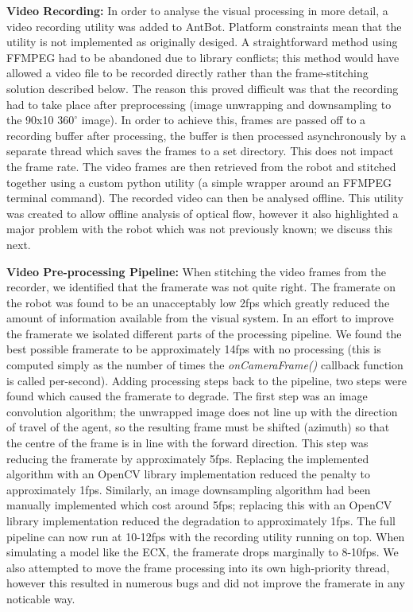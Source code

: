 \documentclass[a4paper,11pt,twoside,openright]{article}
\begin{document}
\textbf{Video Recording:} In order to analyse the visual processing in
more detail, a video recording utility was added to AntBot. Platform
constraints mean that the utility is not implemented as originally
desiged. A straightforward method using FFMPEG had to be abandoned due
to library conflicts; this method would have allowed a video file to
be recorded directly rather than the frame-stitching solution
described below. The reason this proved difficult was that the
recording had to take place after preprocessing (image unwrapping and
downsampling to the 90x10 $360^{\circ}$ image). In order to achieve
this, frames are passed off to a recording buffer after processing, the
buffer is then processed asynchronously by a separate thread which
saves the frames to a set directory. This does not impact
the frame rate. The video frames are then retrieved from the
robot and stitched together using a custom python utility (a simple
wrapper around an FFMPEG terminal command). The recorded video can then be
analysed offline. This utility was created to allow offline analysis
of optical flow, however it also highlighted a major problem with the
robot which was not previously known; we discuss this next.
\newline
\par

\textbf{Video Pre-processing Pipeline:} When stitching the video
frames from the recorder, we identified that the framerate was not
quite right. The framerate on the robot was found to be an
unacceptably low 2fps which greatly reduced the amount of information
available from the visual system. In an effort to improve the
framerate we isolated different parts of the processing pipeline. We
found the best possible framerate to be approximately 14fps with no
processing (this is computed simply as the number of times the
\textit{onCameraFrame()} callback function is called
per-second). Adding processing steps back to the pipeline, two steps
were found which caused the framerate to degrade. The first step was
an image convolution algorithm; the unwrapped image does not line up
with the direction of travel of the agent, so the resulting frame must
be shifted (azimuth) so that the centre of the frame is in line with
the forward direction. This step was reducing the framerate by
approximately 5fps. Replacing the implemented algorithm with an OpenCV
library implementation reduced the penalty to approximately
1fps. Similarly, an image downsampling algorithm had been manually
implemented which cost around 5fps; replacing this with an OpenCV
library implementation reduced the degradation to approximately
1fps. The full pipeline can now run at 10-12fps with the recording
utility running on top. When simulating a model like the ECX, the
framerate drops marginally to 8-10fps. We also attempted to move the
frame processing into its own high-priority thread, however this
resulted in numerous bugs and did not improve the framerate in any
noticable way.
\newline
\par
\end{document}
